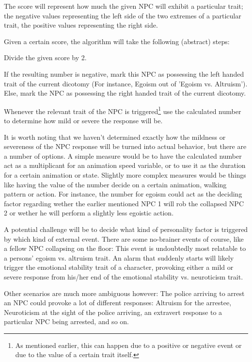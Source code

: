 \documentclass{article}
\begin{document}
   The score will represent how much the given NPC will exhibit a particular trait; the negative values representing the left side of the two extremes of a particular trait, the positive values representing the right side.

   Given a certain score, the algorithm will take the following (abstract) steps:

   \begin{enum}
   \item Divide the given score by 2. 
   \item If the resulting number is negative, mark this NPC as possessing the left handed trait of the current dicotomy (For instance, Egoism out of 'Egoism vs. Altruism'). Else, mark the NPC as possessing the right handed trait of the current dicotomy.
   \item Whenever the relevant trait of the NPC is triggered\footnote{As mentioned earlier, this can happen due to a positive or negative event or due to the value of a certain trait itself.} use the calculated number to determine how mild or severe the response will be.
   \end{enum}

   It is worth noting that we haven't determined exactly how the mildness or severeness of the NPC response will be turned into actual behavior, but there are a number of options. A simple measure would be to have the calculated number act as a multiplicant for an animation speed variable, or to use it as the duration for a certain animation or state. Slightly more complex measures would be things like having the value of the number decide on a certain animation, walking pattern or action. For instance, the number for egoism could act as the deciding factor regarding wether the earlier mentioned NPC 1 will rob the collapsed NPC 2 or wether he will perform a slightly less egoistic action.

   A potential challenge will be to decide what kind of personality factor is triggered by which kind of external event. There are some no-brainer events of course, like a fellow NPC collapsing on the floor: This event is undoubtedly most relatable to a persons' egoism vs. altruism trait. An alarm that suddenly starts will likely trigger the emotional stability trait of a character, provoking either a mild or severe response from his/her end of the emotional stability vs. neuroticism trait. 

   Other scenarios are much more ambiguous however: The police arriving to arrest an NPC could provoke a lot of different responses: Altruism for the arrestee, Neuroticism at the sight of the police arriving, an extravert response to a particular NPC being arrested, and so on. 
\end{document}
